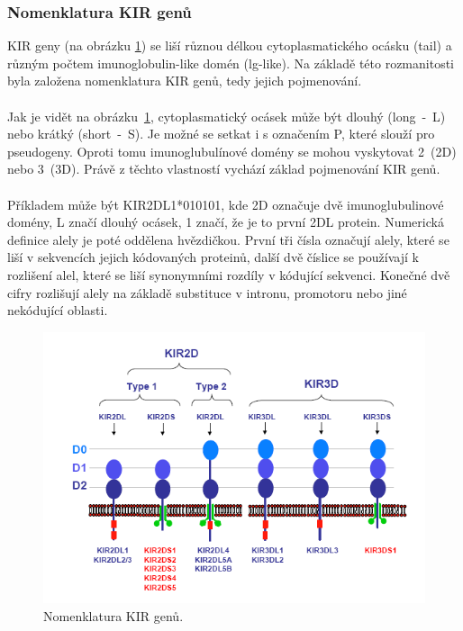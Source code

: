 \documentclass[czech,DP]{thesiskiv}
\numberwithin{equation}{section}
\begin{document}
\subsubsection{Nomenklatura KIR genů}
KIR geny (na obrázku \ref{fig:img_kir_nomenklatura}) se liší různou délkou cytoplasmatického ocásku (tail) a různým počtem imunoglobulin-like domén (lg-like). Na základě této rozmanitosti byla založena nomenklatura KIR genů, tedy jejich pojmenování. 
\\
\\
Jak je vidět na obrázku~\ref{fig:img_kir_nomenklatura}, cytoplasmatický ocásek může být dlouhý (long~-~L) nebo krátký (short~-~S). Je možné se setkat i s označením P, které slouží pro pseudogeny. Oproti tomu imunoglubulínové domény se mohou vyskytovat 2~(2D) nebo 3~(3D). Právě z těchto vlastností vychází základ pojmenování KIR genů. 
\\
\\
Příkladem může být KIR2DL1*010101, kde 2D označuje dvě imunoglubulinové domény, L značí dlouhý ocásek, 1 značí, že je to první 2DL protein. Numerická definice alely je poté oddělena hvězdičkou. První tři čísla označují alely, které se liší v sekvencích jejich kódovaných proteinů, další dvě číslice se používají k rozlišení alel, které se liší synonymními rozdíly v kódující sekvenci. Konečné dvě cifry rozlišují alely na základě substituce v intronu, promotoru nebo jiné nekódující oblasti. \cite{imgt_hla_database}

\begin{figure}[H]		
		\centering
		\includegraphics[width=\textwidth]{./img/KIR_nomenklatura.png}
		\caption{Nomenklatura KIR genů. \cite{KIR_transplantace_jindra}}
		\label{fig:img_kir_nomenklatura}
\end{figure}
\end{document}
